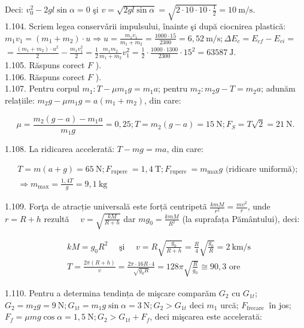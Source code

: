 \documentclass[10pt]{article}
\begin{document}
Deci: $v_{0}^{2}-2 g l \sin \alpha=0$ şi $v=\sqrt{2 g l \sin \alpha}=\sqrt{2 \cdot 10 \cdot 10 \cdot \frac{1}{2}}=10 \mathrm{~m} / \mathrm{s}$.\\
1.104. Scriem legea conservǎrii impulsului, înainte şi după ciocnirea plastică:\\
$m_{1} v_{1}=\left(m_{1}+m_{2}\right) \cdot u \Rightarrow u=\frac{m_{1} v_{1}}{m_{1}+m_{2}}=\frac{1000 \cdot 15}{2300}=6,52 \mathrm{~m} / \mathrm{s} ; \Delta E_{c}=E_{c f}-E_{c i}=$\\
$=\frac{\left(m_{1}+m_{2}\right) \cdot u^{2}}{2}-\frac{m_{1} v_{1}^{2}}{2}=\frac{1}{2} \frac{m_{1} m_{2}}{m_{1}+m_{2}} v_{1}^{2}=\frac{1}{2} \cdot \frac{1000 \cdot 1300}{2300} \cdot 15^{2}=63587 \mathrm{~J}$.\\
1.105. Răspuns corect $F$ ).\\
1.106. Răspuns corect $F$ ).\\
1.107. Pentru corpul $m_{1}: T-\mu m_{1} g=m_{1} a$; pentru $m_{2}: m_{2} g-T=m_{2} a$; adunăm relațiile: $m_{2} g-\mu m_{1} g=a\left(m_{1}+m_{2}\right)$, din care:

$$
\mu=\frac{m_{2}(g-a)-m_{1} a}{m_{1} g}=0,25 ; T=m_{2}(g-a)=15 \mathrm{~N} ; F_{S}=T \sqrt{2}=21 \mathrm{~N} .
$$

1.108. La ridicarea accelerată: $T-m g=m a$, din care:

$$
\begin{aligned}
& T=m(a+g)=65 \mathrm{~N} ; F_{\text {rupere }}=1,4 \mathrm{~T} ; F_{\text {rupere }}=m_{\max } g \text { (ridicare uniformă); } \\
& \Rightarrow m_{\max }=\frac{1,4 T}{g}=9,1 \mathrm{~kg}
\end{aligned}
$$

1.109. Forţa de atracție universală este forță centripetã $\frac{k m M}{r^{2}}=\frac{m v^{2}}{r}$, unde $r=R+h$ rezultă $\quad v=\sqrt{\frac{k M}{R+h}}$ dar $m g_{0}=\frac{k m M}{R^{2}}$ (la suprafața Pământului), deci:

$$
\begin{aligned}
& k M=g_{0} R^{2} \quad \text { şi } \quad v=R \sqrt{\frac{g_{0}}{R+h}}=\frac{R}{4} \sqrt{\frac{g_{0}}{R}}=2 \mathrm{~km} / \mathrm{s} \\
& T=\frac{2 \pi(R+h)}{v}=\frac{2 \pi \cdot 16 R \cdot 4}{\sqrt{g_{0} R}}=128 \pi \sqrt{\frac{R}{g_{0}}} \cong 90,3 \text { ore }
\end{aligned}
$$

1.110. Pentru a determina tendința de mişcare comparăm $G_{2}$ cu $G_{1 t}$; $G_{2}=m_{2} g=9 \mathrm{~N} ; G_{1 t}=m_{1} g \sin \alpha=3 \mathrm{~N} ; G_{2}>G_{1 t}$ deci $m_{1}$ urcă; $F_{\text {frecare }}$ în jos; $F_{f}=\mu m g \cos \alpha=1,5 \mathrm{~N} ; G_{2}>G_{1 t}+F_{f}$, deci mişcarea este accelerată:
\end{document}
